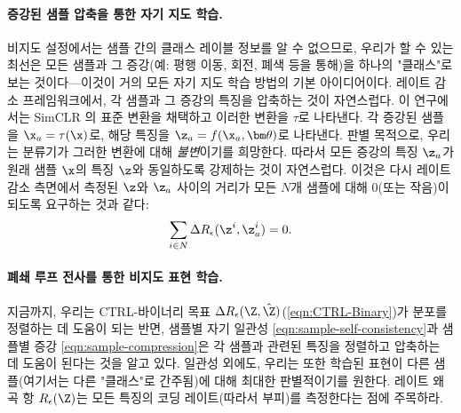 \documentclass[../../book-main_ko.tex]{subfiles}
\begin{document}
\paragraph{증강된 샘플 압축을 통한 자기 지도 학습.} 비지도 설정에서는 샘플 간의 클래스 레이블 정보를 알 수 없으므로, 우리가 할 수 있는 최선은 모든 샘플과 그 증강(예: 평행 이동, 회전, 폐색 등을 통해)을 하나의 "클래스"로 보는 것이다—이것이 거의 모든 자기 지도 학습 방법의 기본 아이디어이다. 레이트 감소 프레임워크에서, 각 샘플과 그 증강의 특징을 압축하는 것이 자연스럽다. 이 연구에서는 SimCLR \cite{chen2020simple}의 표준 변환을 채택하고 이러한 변환을 $\tau$로 나타낸다. 각 증강된 샘플을 $\x_a = \tau(\x)$로, 해당 특징을 $\z_a = f(\x_a, \bm \theta)$로 나타낸다. 판별 목적으로, 우리는 분류기가 그러한 변환에 대해 \textit{불변}이기를 희망한다. 따라서 모든 증강의 특징 $\z_a$가 원래 샘플 $\x$의 특징 $\z$와 동일하도록 강제하는 것이 자연스럽다. 이것은 다시 레이트 감소 측면에서 측정된 $\z$와 $\z_a$ 사이의 거리가 모든 $N$개 샘플에 대해 0(또는 작음)이 되도록 요구하는 것과 같다:
\begin{align}
\sum_{i\in N} \Delta R_\epsilon(\z^i,\z_{a}^i) = 0.
\label{eqn:sample-compression}\vspace{-3mm}
\end{align}

\paragraph{폐쇄 루프 전사를 통한 비지도 표현 학습.} 지금까지, 우리는 CTRL-바이너리 목표 $\Delta R_\epsilon(\Z, \hat{\Z})$(\eqref{eqn:CTRL-Binary})가 분포를 정렬하는 데 도움이 되는 반면, 샘플별 자기 일관성 \eqref{eqn:sample-self-consistency}과 샘플별 증강 \eqref{eqn:sample-compression}은 각 샘플과 관련된 특징을 정렬하고 압축하는 데 도움이 된다는 것을 알고 있다. 일관성 외에도, 우리는 또한 학습된 표현이 다른 샘플(여기서는 다른 "클래스"로 간주됨)에 대해 최대한 판별적이기를 원한다. 레이트 왜곡 항 $R_\epsilon(\Z)$는 모든 특징의 코딩 레이트(따라서 부피)를 측정한다는 점에 주목하라. %
\end{document}
